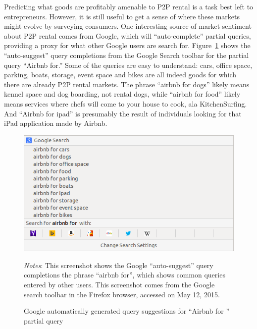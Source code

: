 \documentclass[11pt]{article}
\begin{document}
Predicting what goods are profitably amenable to P2P rental is a task best left to entrepreneurs. 
However, it is still useful to get a sense of where these markets might evolve by surveying consumers. 
One interesting source of market sentiment about P2P rental comes from Google, which will ``auto-complete'' partial queries, providing a proxy for what other Google users are search for. 
Figure~\ref{fig:auto} shows the ``auto-suggest'' query completions from the Google Search toolbar for the partial query ``Airbnb for.''
Some of the queries are easy to understand: 
cars, office space, parking, boats, storage, event space and bikes are all indeed goods for which there are already P2P rental markets. 
The phrase ``airbnb for dogs'' likely means kennel space and dog boarding, not rental dogs, while ``airbnb for food'' likely means services where chefs will come to your house to cook, ala KitchenSurfing. 
And ``Airbnb for ipad'' is presumably the result of individuals looking for that iPad application made by Airbnb. 

\begin{figure}
\centering 
\caption{Google automatically generated query suggestions for ``Airbnb for '' partial query}
\label{fig:auto} 
\begin{minipage}{0.70 \linewidth}
  \includegraphics[width = \linewidth]{./images/airbnb_for_x.png} \\
  \begin{footnotesize}
  \emph{Notes}: This screenshot shows the Google ``auto-suggest'' query completions the phrase ``airbnb for'', which shows common queries entered by other users.
  This screenshot comes from the Google search toolbar in the Firefox browser, accessed on May 12, 2015.
  \end{footnotesize}
\end{minipage}
\end{figure} 
\end{document}
